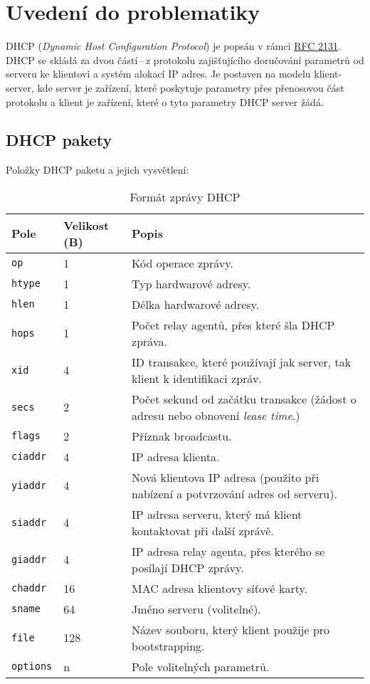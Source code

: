 \documentclass[a4paper, 11pt, hidelinks]{article}
\begin{document}
\newpage
\section{Uvedení do problematiky}\label{1_problematika}
DHCP (\emph{Dynamic Host Configuration Protocol}) je popsán v rámci \href{https://datatracker.ietf.org/doc/html/rfc2131}{RFC 2131}. 
DHCP se skládá za dvou částí\,--\,z protokolu zajišťujícího doručování parametrů od serveru ke klientovi a systém alokací IP adres.
Je postaven na modelu klient-server, kde server je zařízení, které poskytuje parametry přes přenosovou část protokolu a klient je zařízení, které o tyto parametry DHCP server žádá.

\subsection{DHCP pakety}\label{1_1_pakety}
Položky DHCP paketu a jejich vysvětlení:
\begin{table}[ht]
  \centering
  \begin{tabularx}{\textwidth}{p{}p{}p{}}
    \toprule
    \textbf{Pole} & \textbf{Velikost (B)} & \textbf{Popis} \\
    \midrule
    \texttt{op} & 1 & Kód operace zprávy. \\
    \texttt{htype} & 1 & Typ hardwarové adresy. \\
    \texttt{hlen} & 1 & Délka hardwarové adresy. \\
    \texttt{hops} & 1 & Počet relay agentů\footnotemark[2], přes které šla DHCP zpráva. \\
    \texttt{xid} & 4 & ID transakce, které používají jak server, tak klient k identifikaci zpráv. \\
    \texttt{secs} & 2 & Počet sekund od začátku transakce (žádost o adresu nebo obnovení \emph{lease time}.) \\
    \texttt{flags} & 2 & Příznak broadcastu. \\
    \texttt{ciaddr} & 4 & IP adresa klienta. \\
    \texttt{yiaddr} & 4 & Nová klientova IP adresa (použito při nabízení a potvrzování adres od serveru). \\
    \texttt{siaddr} & 4 & IP adresa serveru, který má klient kontaktovat při další zprávě. \\
    \texttt{giaddr} & 4 & IP adresa relay agenta, přes kterého se posílají DHCP zprávy. \\
    \texttt{chaddr} & 16 & MAC adresa klientovy síťové karty. \\
    \texttt{sname} & 64 & Jméno serveru (volitelné). \\
    \texttt{file} & 128 & Název souboru, který klient použije pro bootstrapping\footnotemark[3]. \\
    \texttt{options} & n & Pole volitelných parametrů.\\
    \bottomrule
  \end{tabularx}
  \label{tab:dhcp-format}
  \caption{Formát zprávy DHCP}
\end{table}
\end{document}
